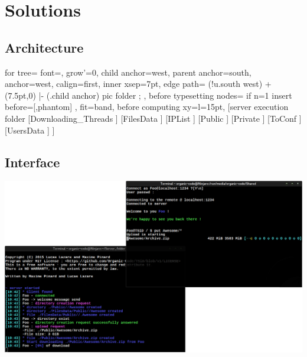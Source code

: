 \documentclass[11pt]{beamer}
\begin{document}
\section{Solutions}
	
	\subsection{Architecture}

		\begin{frame}
			\begin{forest}
			  for tree={
			    font=\ttfamily,
			    grow'=0,
			    child anchor=west,
			    parent anchor=south,
			    anchor=west,
			    calign=first,
			    inner xsep=7pt,
			    edge path={
			      \noexpand{}
			      (!u.south west) +(7.5pt,0) |- (.child anchor) pic {folder} ;
			    },
			    before typesetting nodes={
			      if n=1
			        {insert before={[,phantom]}}
			        {}
			    },
			    fit=band,
			    before computing xy={l=15pt},
			  }  
			[server execution folder
			  [Downloading\_Threads
			  ]
			  [FilesData
			  ]
			  [IPList
			  ]
			  [Public
			  ]
			  [Private
			  ]
			  [ToConf
			  ]
			  [UsersData
			  ]
			]
			\end{forest}
		\end{frame}

	\subsection*{Interface}

		\begin{frame}
			\includegraphics[width=\linewidth]{interface}
		\end{frame}
\end{document}
